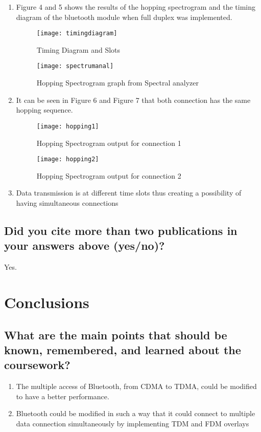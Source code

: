 \begin{enumerate}		
	\item Figure 4 and 5 shows the results of the hopping spectrogram and the timing diagram of the bluetooth module when full duplex was implemented.
	
		\begin{figure}[ht]
			\centering
			\captionsetup{justification=centering,margin=2cm}
			\texttt{[image: timingdiagram]}
			\caption{Timing Diagram and Slots}
		\end{figure}
	\begin{figure}[ht]
	\centering
	\captionsetup{justification=centering,margin=2cm}
	\texttt{[image: spectrumanal]}
	\caption{Hopping Spectrogram graph from Spectral analyzer
	}
	\end{figure}

	\item It can be seen in Figure 6 and Figure 7 that both connection has the same hopping sequence.
	
	\begin{figure}[ht]
	\centering
	\captionsetup{justification=centering,margin=2cm}
	\texttt{[image: hopping1]}
	\caption{Hopping Spectrogram output for connection 1}
	\end{figure}


	\begin{figure}[ht]
	\centering
	\captionsetup{justification=centering,margin=2cm}
	\texttt{[image: hopping2]}
	\caption{Hopping Spectrogram output for connection 2}
	\end{figure}
	\item Data transmission is at different time slots thus creating a possibility of having simultaneous connections

\end{enumerate}

\subsection{Did you cite more than two publications in your answers above (yes/no)?}
Yes.	

\section{Conclusions}
\label{sec:conc}

\subsection{What are the main points that should be known, remembered, and learned about the coursework?}
\begin{enumerate}
	\item The multiple access of Bluetooth, from CDMA to TDMA, could be modified to have a better performance.
	\item Bluetooth could be modified in such a way that it could connect to multiple data connection simultaneously by implementing TDM and FDM overlays
\end{enumerate}

